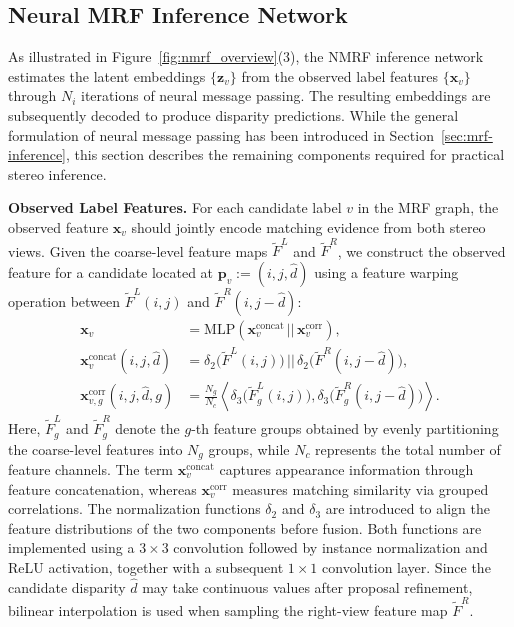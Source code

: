 \subsection{Neural MRF Inference Network}\label{sec:nmrf_inference_network}
As illustrated in Figure~\ref{fig:nmrf_overview}(3), the NMRF inference network estimates the latent embeddings $\{\mathbf{z}_v\}$ from the observed label features $\{\mathbf{x}_v\}$ through $N_i$ iterations of neural message passing.
The resulting embeddings are subsequently decoded to produce disparity predictions.
While the general formulation of neural message passing has been introduced in Section~\ref{sec:mrf-inference}, this section describes the remaining components required for practical stereo inference.

\noindent\textbf{Observed Label Features.}
For each candidate label $v$ in the MRF graph, the observed feature $\mathbf{x}_v$ should jointly encode matching evidence from both stereo views.
Given the coarse-level feature maps $\tilde{F}^L$ and $\tilde{F}^R$, we construct the observed feature for a candidate located at $\mathbf{p}_v := (i,j,\hat{d})$ using a feature warping operation between $\tilde{F}^L(i,j)$ and $\tilde{F}^R(i,j-\hat{d})$:
\begin{align}
	\mathbf{x}_v
	&=
	\mathrm{MLP}
	\left(
	\mathbf{x}_v^{\mathrm{concat}}
	\, || \,
	\mathbf{x}_v^{\mathrm{corr}}
	\right), \nonumber \\
	\mathbf{x}_v^{\mathrm{concat}}(i,j,\hat{d})
	&=
	\delta_2\big(\tilde{F}^L(i,j)\big)
	\, || \,
	\delta_2\big(\tilde{F}^R(i,j-\hat{d})\big), \\
	\mathbf{x}_{v,g}^{\mathrm{corr}}(i,j,\hat{d},g)
	&=
	\frac{N_g}{N_c}
	\left\langle
	\delta_3\big(\tilde{F}_g^L(i,j)\big),
	\delta_3\big(\tilde{F}_g^R(i,j-\hat{d})\big)
	\right\rangle. \nonumber
\end{align}
Here, $\tilde{F}_g^L$ and $\tilde{F}_g^R$ denote the $g$-th feature groups obtained by evenly partitioning the coarse-level features into $N_g$ groups, while $N_c$ represents the total number of feature channels.
The term $\mathbf{x}_v^{\mathrm{concat}}$ captures appearance information through feature concatenation, whereas $\mathbf{x}_v^{\mathrm{corr}}$ measures matching similarity via grouped correlations.
The normalization functions $\delta_2$ and $\delta_3$ are introduced to align the feature distributions of the two components before fusion.
Both functions are implemented using a $3 \times 3$ convolution followed by instance normalization and ReLU activation, together with a subsequent $1 \times 1$ convolution layer.
Since the candidate disparity $\hat{d}$ may take continuous values after proposal refinement, bilinear interpolation is used when sampling the right-view feature map $\tilde{F}^R$.

